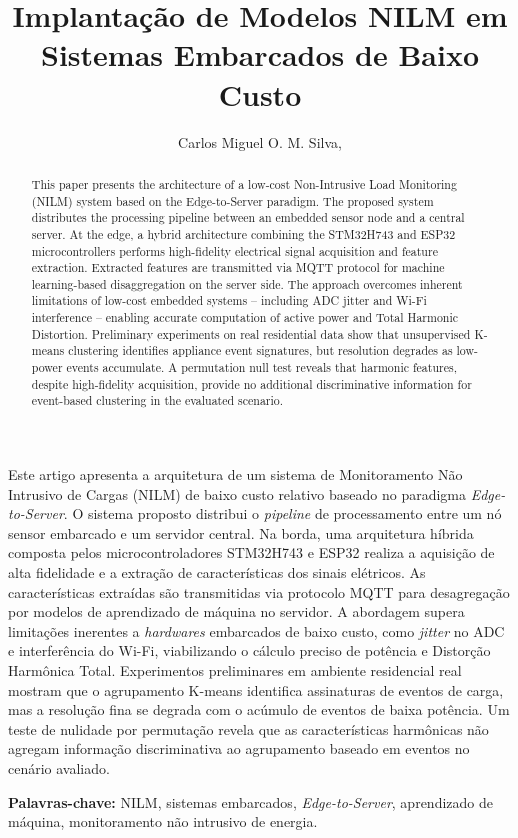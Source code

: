 \documentclass[12pt]{article}
\title{Implanta\c{c}\~ao de Modelos NILM em Sistemas Embarcados de Baixo Custo}
\author{
  Carlos Miguel O. M. Silva\inst{1},
}
\begin{document}
\maketitle

\begin{abstract}
  This paper presents the architecture of a low-cost Non-Intrusive Load
  Monitoring (NILM) system based on the Edge-to-Server paradigm. The proposed
  system distributes the processing pipeline between an embedded sensor node
  and a central server. At the edge, a hybrid architecture combining the
  STM32H743 and ESP32 microcontrollers performs high-fidelity electrical
  signal acquisition and feature extraction. Extracted features are transmitted
  via MQTT protocol for machine learning-based disaggregation on the server
  side. The approach overcomes inherent limitations of low-cost embedded
  systems -- including ADC jitter and Wi-Fi interference -- enabling accurate
  computation of active power and Total Harmonic Distortion.
  Preliminary experiments on real residential data show that unsupervised
  K-means clustering identifies appliance event signatures, but resolution
  degrades as low-power events accumulate. A permutation null test reveals that
  harmonic features, despite high-fidelity acquisition, provide no additional
  discriminative information for event-based clustering in the evaluated
  scenario.
\end{abstract}

\begin{resumo}
  Este artigo apresenta a arquitetura de um sistema de Monitoramento N\~ao
  Intrusivo de Cargas (NILM) de baixo custo relativo baseado no paradigma
  \textit{Edge-to-Server}. O sistema proposto distribui o \textit{pipeline} de
  processamento entre um n\'o sensor embarcado e um servidor central. Na borda,
  uma arquitetura h\'ibrida composta pelos microcontroladores STM32H743 e ESP32
  realiza a aquisi\c{c}\~ao de alta fidelidade e a extra\c{c}\~ao de
  caracter\'isticas dos sinais el\'etricos. As caracter\'isticas extra\'idas
  s\~ao transmitidas via protocolo MQTT para desagrega\c{c}\~ao por modelos de
  aprendizado de m\'aquina no servidor. A abordagem supera limita\c{c}\~oes
  inerentes a \textit{hardwares} embarcados de baixo custo, como \textit{jitter}
  no ADC e interfer\^encia do Wi-Fi, viabilizando o c\'alculo preciso de
  pot\^encia e Distor\c{c}\~ao Harm\^onica Total.
  Experimentos preliminares em ambiente residencial real mostram que o
  agrupamento K-means identifica assinaturas de eventos de carga, mas a
  resolu\c{c}\~ao fina se degrada com o ac\'umulo de eventos de baixa pot\^encia.
  Um teste de nulidade por permuta\c{c}\~ao revela que as caracter\'isticas
  harm\^onicas n\~ao agregam informa\c{c}\~ao discriminativa ao agrupamento
  baseado em eventos no cen\'ario avaliado.

  \textbf{Palavras-chave:} NILM, sistemas embarcados, \textit{Edge-to-Server},
  aprendizado de m\'aquina, monitoramento n\~ao intrusivo de energia.
\end{resumo}
\end{document}
